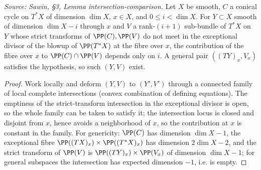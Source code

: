 \begin{lemma}
  \label{lem:sawin_intersection_comparison}
  \textit{Source: Sawin, §3, Lemma intersection-comparison.}
  Let $X$ be smooth, $C$ a conical cycle on $T^*X$ of dimension $\dim X$, $x\in
  X$, and $0\le i<\dim X$.  For $Y\subset X$ smooth of dimension $\dim X-i$
  through $x$ and $V$ a rank-$(i+1)$ sub-bundle of $T^*X$ on $Y$ whose strict
  transforms of $\PP(C),\PP(V)$ do not meet in the exceptional divisor of the
  blowup of $\PP(T^*X)$ at the fibre over $x$, the contribution of the fibre over
  $x$ to $\PP(C)\cap\PP(V)$ depends only on $i$.  A general pair $((TY)_x,V_x)$
  satisfies the hypothesis, so such $(Y,V)$ exist.
\end{lemma}
\begin{proof}
  Work locally and deform $(Y,V)$ to $(Y',V')$ through a connected family of
  local complete intersections (convex combination of defining equations).  The
  emptiness of the strict-transform intersection in the exceptional divisor is
  open, so the whole family can be taken to satisfy it; the intersection locus is
  closed and disjoint from $x$, hence avoids a neighborhood of $x$, so the
  contribution at $x$ is constant in the family.  For genericity: $\PP(C)$ has
  dimension $\dim X-1$, the exceptional fibre $\PP((TX)_x)\times\PP((T^*X)_x)$ has
  dimension $2\dim X-2$, and the strict transform of $\PP(V)$ is
  $\PP((TY)_x)\times\PP(V_x)$ of dimension $\dim X-1$; for general subspaces the
  intersection has expected dimension $-1$, i.e. is empty.
\end{proof}

